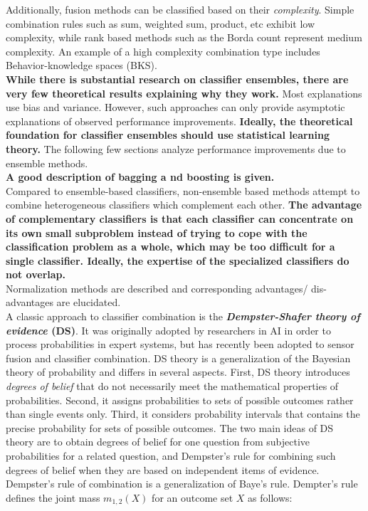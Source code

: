 \documentclass[]{article}
\begin{document}
			\noindent
			Additionally, fusion methods can be classified based on their \textit{complexity}.  Simple combination rules such as sum, weighted sum, product, etc exhibit low complexity, while rank based methods such as the Borda count represent medium complexity.  An example of a high complexity combination type includes Behavior-knowledge spaces (BKS).\\
			\textbf{While there is substantial research on classifier ensembles, there are very few theoretical results explaining why they work.}  Most explanations use bias and variance.  However, such approaches can only provide asymptotic explanations of observed performance improvements.  \textbf{Ideally, the theoretical foundation for classifier ensembles should use statistical learning theory.}  The following few sections analyze performance improvements due to ensemble methods. \\
			\textbf{A good description of bagging a nd boosting is given.} \\
			Compared to ensemble-based classifiers, non-ensemble based methods attempt to combine heterogeneous classifiers which complement each other.  \textbf{The advantage of complementary classifiers is that each classifier can concentrate on its own small subproblem instead of trying to cope with the classification problem as a whole, which may be too difficult for a single classifier.  Ideally, the expertise of the specialized classifiers do not overlap.} \\
			Normalization methods are described and corresponding advantages/ dis-advantages are elucidated. \\
			A classic approach to classifier combination is the \textbf{\textit{Dempster-Shafer theory of evidence} (DS)}.  It was originally adopted by researchers in AI in order to process probabilities in expert systems, but has recently been adopted to sensor fusion and classifier combination.   DS theory is a generalization of the Bayesian theory of probability and differs in several aspects. First, DS theory introduces \textit{degrees of belief} that do not necessarily meet the mathematical properties of probabilities.  Second, it assigns probabilities to sets of possible outcomes rather than single events only.  Third, it considers probability intervals that contains the precise probability for sets of possible outcomes.  The two main ideas of DS theory are to obtain degrees of belief for one question from subjective probabilities for a related question, and Dempster's rule for combining such degrees of belief when they are based on independent items of evidence.  Dempster's rule of combination is a generalization of Baye's rule.  Dempter's rule defines the joint mass $m_{1,2}(X)$ for an outcome set $X$ as follows:
			
\end{document}
